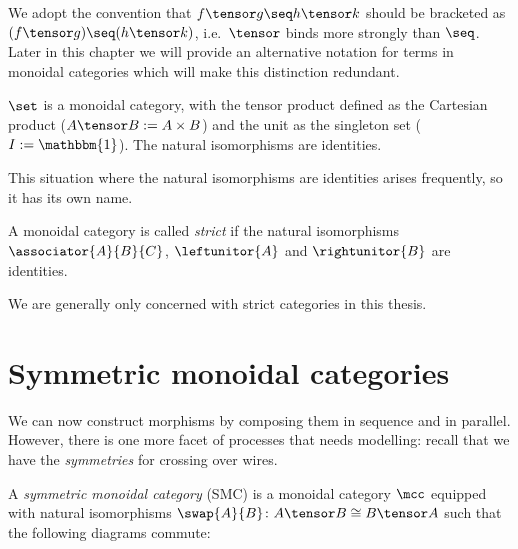We adopt the convention that \(f \tensor g \seq h \tensor k\) should be
bracketed as \((f \tensor g) \seq (h \tensor k)\), i.e.\ \(\tensor\) binds
more strongly than \(\seq\).
Later in this chapter we will provide an alternative notation for terms
in monoidal categories which will make this distinction redundant.

\begin{example}
    \(\set\) is a monoidal category, with the tensor product defined as the
    Cartesian product (\(A \tensor B := A \times B\)) and the unit as the
    singleton set (\(I := \mathbbm{1}\)).
    The natural isomorphisms are identities.
\end{example}

This situation where the natural isomorphisms are identities arises frequently,
so it has its own name.

\begin{definition}
    A monoidal category is called \emph{strict} if the natural isomorphisms \(
        \associator{A}{B}{C}
    \), \(
        \leftunitor{A}
    \) and \(
        \rightunitor{B}
    \) are identities.
\end{definition}

We are generally only concerned with strict categories in this thesis.

\section{Symmetric monoidal categories}

We can now construct morphisms by composing them in sequence and in parallel.
However, there is one more facet of processes that needs modelling: recall that
we have the \emph{symmetries} for crossing over wires.

\begin{definition}
    \label{def:symmetric-monoidal-category}
    A \emph{symmetric monoidal category} (SMC) is a monoidal category \(\mcc\)
    equipped with natural isomorphisms \(
        \swap{A}{B} \colon A \tensor B \cong B \tensor A
    \) such that the following diagrams commute:
    \begin{center}
        
        

        \vspace{1em}

        
    \end{center}
\end{definition}

